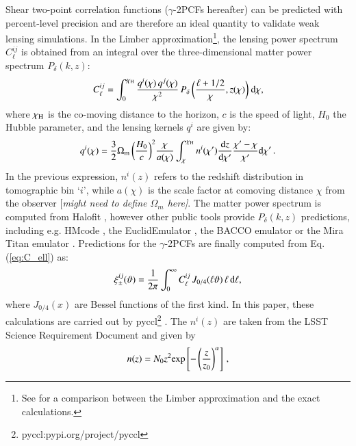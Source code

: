 \documentclass[useAMS,usenatbib]{mn2e}
\begin{document}
 Shear two-point correlation functions ($\gamma$-2PCFs hereafter) can be predicted with percent-level precision and are therefore an ideal quantity to validate weak lensing simulations. In the Limber approximation\footnote{See \citet{Kilbinger} for a comparison between the Limber approximation and the exact calculations.}, the lensing power spectrum $C^{ij}_{\ell}$ is obtained from an integral over the three-dimensional matter power spectrum $P_{\delta}(k,z)$:
  \begin{eqnarray}
C_{\ell}^{ij} = \int_0^{\chi_{\rm H}}  \frac{q^i(\chi) \,q^j(\chi)}{\chi^2} \, P_{\delta}\, \bigg(\frac{\ell+1/2}{\chi},z(\chi)\bigg) \ {\rm d}\chi,
\label{eq:C_ell}
\end{eqnarray}
where $\chi_{\rm H}$ is the co-moving distance to the horizon, $c$ is the speed of light, $H_0$ the Hubble parameter,  and the  lensing kernels $q^{i}$ are given by:
\begin{eqnarray}
q^i(\chi) = \frac{3}{2}\Omega_{\rm m} \, \bigg(\frac{H_0}{c} \bigg)^2 \frac{\chi}{a(\chi)} \int_{\chi}^{\chi_{\rm H}} n^i(\chi')\frac{{\rm d}z}{{\rm d} \chi'}\frac{\chi' - \chi}{\chi'}{\rm d}\chi' \, .
\label{eq:q_lensing}
\end{eqnarray}
In the previous expression, $n^i(z)$ refers to the redshift distribution  in tomographic bin `$i$', while $a(\chi)$ is the scale factor at comoving distance $\chi$ from the observer {[\it might need to define $\Omega_m$ here]}.  
 The matter power spectrum is computed from  {\sc Halofit} \citep{Takahashi2012}, however  other public tools provide $P_{\delta}(k,z)$ predictions, including e.g. {\sc HMcode} \citep{HMCode2020}, the {\sc EuclidEmulator} \citep{EuclidEmulator}, the {\sc BACCO} emulator \citep{BACC0} or the Mira Titan emulator \citep{miraTitan}. 
 Predictions for the $\gamma$-2PCFs are finally computed from Eq. (\ref{eq:C_ell}) as:
 \begin{eqnarray}
\xi_{\pm}^{ij}(\vartheta) = \frac{1}{2\pi}\int_0^{\infty} C_{\ell}^{ij} \, J_{0/4}(\ell \vartheta) \, \ell \, {\rm d}\ell,
\label{eq:xipm_th}
\end{eqnarray}
where $J_{0/4}(x)$ are Bessel functions of the first kind. In this paper, these calculations are carried out by {\sc pyccl}\footnote{{\sc pyccl}:pypi.org/project/pyccl}  \citep{pyccl}.
The $n^i(z)$ are taken from the LSST Science Requirement Document \cite{LSST-SRD} and given by
 \begin{eqnarray}
n(z) = N_0 z^2 {\rm exp} \left[-\left(\frac{z}{z_0}\right)^\alpha \right]\, ,
\label{eq:nz}
\end{eqnarray}
\end{document}
